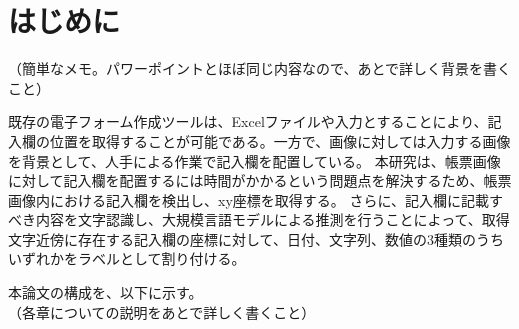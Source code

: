 \chapter{はじめに}\label{cha:Introduction}
（簡単なメモ。パワーポイントとほぼ同じ内容なので、あとで詳しく背景を書くこと）

既存の電子フォーム作成ツールは、Excelファイルや入力とすることにより、記入欄の位置を取得することが可能である。一方で、画像に対しては入力する画像を背景として、人手による作業で記入欄を配置している。
本研究は、帳票画像に対して記入欄を配置するには時間がかかるという問題点を解決するため、帳票画像内における記入欄を検出し、xy座標を取得する。
さらに、記入欄に記載すべき内容を文字認識し、大規模言語モデルによる推測を行うことによって、取得文字近傍に存在する記入欄の座標に対して、日付、文字列、数値の3種類のうちいずれかをラベルとして割り付ける。

本論文の構成を、以下に示す。\\
  （各章についての説明をあとで詳しく書くこと）

